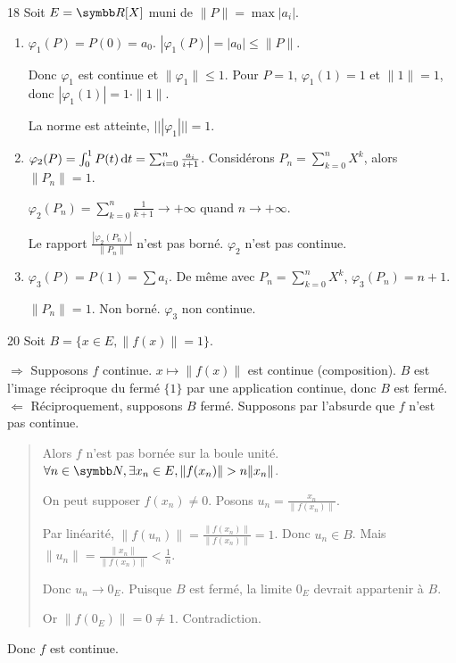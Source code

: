 \begin{correction}{18}
Soit $E = \R[X]$ muni de $\|P\| = \max |a_{i}|$.
\begin{enumerate}
    \item $\varphi_{1}(P) = P(0) = a_{0}$. $|\varphi_{1}(P)| = |a_{0}| \leqslant \|P\|$.
    
        Donc $\varphi_{1}$ est continue et $\|\varphi_{1}\| \leqslant 1$.
        Pour $P=1$, $\varphi_{1}(1)=1$ et $\|1\|=1$, donc $|\varphi_{1}(1)| = 1 \cdot \|1\|$.

        La norme est atteinte, $|||\varphi_{1}||| = 1$.

    \item $\varphi_{2}(P) = \int_{0}^{1} P(t) \,\mathrm{d}t = \sum_{i=0}^{n} \frac{a_{i}}{i+1}$.
        Considérons $P_{n} = \sum_{k=0}^{n} X^{k}$, alors $\|P_{n}\| = 1$.

        $\varphi_{2}(P_{n}) = \sum_{k=0}^{n} \frac{1}{k+1} \to +\infty$ quand $n \to +\infty$.

        Le rapport $\frac{|\varphi_{2}(P_{n})|}{\|P_{n}\|}$ n'est pas borné.
        $\varphi_{2}$ n'est pas continue.

    \item $\varphi_{3}(P) = P(1) = \sum a_{i}$.
        De même avec $P_{n} = \sum_{k=0}^{n} X^{k}$, $\varphi_{3}(P_{n}) = n+1$.

        $\|P_{n}\| = 1$. Non borné. $\varphi_{3}$ non continue.
\end{enumerate}
\end{correction}

\begin{correction}{20}
    Soit $B = \{x \in E, \|f(x)\| = 1\}$.

    $\Rightarrow$ Supposons $f$ continue. $x \mapsto \|f(x)\|$ est continue (composition).
    $B$ est l'image réciproque du fermé $\{1\}$ par une application continue, donc $B$ est fermé. \\

    $\Leftarrow$ Réciproquement, supposons $B$ fermé. Supposons par l'absurde que $f$ n'est pas continue.
    \begin{quote}
        Alors $f$ n'est pas bornée sur la boule unité.
        $\forall n \in \N, \exists x_{n} \in E, \|f(x_{n})\| > n \|x_{n}\|$.

        On peut supposer $f(x_{n}) \neq 0$.
        Posons $u_{n} = \frac{x_{n}}{\|f(x_{n})\|}$.

        Par linéarité, $\|f(u_{n})\| = \frac{\|f(x_{n})\|}{\|f(x_{n})\|} = 1$. Donc $u_{n} \in B$.
        Mais $\|u_{n}\| = \frac{\|x_{n}\|}{\|f(x_{n})\|} < \frac{1}{n}$.

        Donc $u_{n} \to 0_{E}$.
        Puisque $B$ est fermé, la limite $0_{E}$ devrait appartenir à $B$.

        Or $\|f(0_{E})\| = 0 \neq 1$. Contradiction.
    \end{quote}
    Donc $f$ est continue.
\end{correction}

